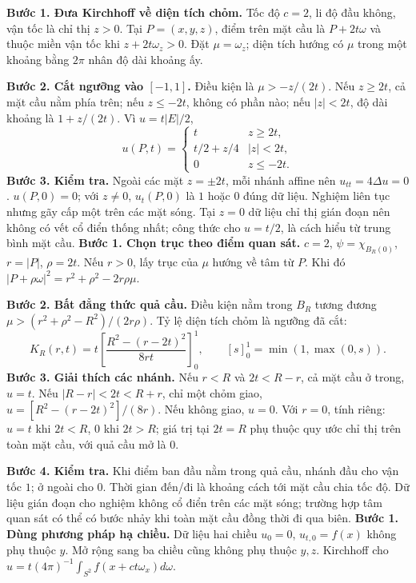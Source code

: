 \textbf{Bước 1. Đưa Kirchhoff về diện tích chỏm.} Tốc độ $c=2$, li độ đầu không, vận tốc là chỉ thị $z>0$. Tại $P=(x,y,z)$, điểm trên mặt cầu là $P+2t\omega$ và thuộc miền vận tốc khi $z+2t\omega_z>0$. Đặt $\mu=\omega_z$; diện tích hướng có $\mu$ trong một khoảng bằng $2\pi$ nhân độ dài khoảng ấy.

\textbf{Bước 2. Cắt ngưỡng vào $[-1,1]$.} Điều kiện là $\mu>-z/(2t)$. Nếu $z\ge2t$, cả mặt cầu nằm phía trên; nếu $z\le-2t$, không có phần nào; nếu $|z|<2t$, độ dài khoảng là $1+z/(2t)$. Vì $u=t|E|/2$,
\[u(P,t)=\begin{cases}t&z\ge2t,\\t/2+z/4&|z|<2t,\\0&z\le-2t.\end{cases}\]
\textbf{Bước 3. Kiểm tra.} Ngoài các mặt $z=\pm2t$, mỗi nhánh affine nên $u_{tt}=4\Delta u=0$. $u(P,0)=0$; với $z\ne0$, $u_t(P,0)$ là $1$ hoặc $0$ đúng dữ liệu. Nghiệm liên tục nhưng gãy cấp một trên các mặt sóng. Tại $z=0$ dữ liệu chỉ thị gián đoạn nên không có vết cổ điển thống nhất; công thức cho $u=t/2$, là cách hiểu từ trung bình mặt cầu.
\textbf{Bước 1. Chọn trục theo điểm quan sát.} $c=2$, $\psi=\chi_{B_R(0)}$, $r=|P|$, $\rho=2t$. Nếu $r>0$, lấy trục của $\mu$ hướng về tâm từ $P$. Khi đó $|P+\rho\omega|^2=r^2+\rho^2-2r\rho\mu$.

\textbf{Bước 2. Bất đẳng thức quả cầu.} Điều kiện nằm trong $B_R$ tương đương $\mu>(r^2+\rho^2-R^2)/(2r\rho)$. Tỷ lệ diện tích chỏm là ngưỡng đã cắt:
\[K_R(r,t)=t\left[\frac{R^2-(r-2t)^2}{8rt}\right]_0^1,\qquad [s]_0^1=\min(1,\max(0,s)).\]
\textbf{Bước 3. Giải thích các nhánh.} Nếu $r<R$ và $2t<R-r$, cả mặt cầu ở trong, $u=t$. Nếu $|R-r|<2t<R+r$, chỉ một chỏm giao, $u=[R^2-(r-2t)^2]/(8r)$. Nếu không giao, $u=0$. Với $r=0$, tính riêng: $u=t$ khi $2t<R$, $0$ khi $2t>R$; giá trị tại $2t=R$ phụ thuộc quy ước chỉ thị trên toàn mặt cầu, với quả cầu mở là $0$.

\textbf{Bước 4. Kiểm tra.} Khi điểm ban đầu nằm trong quả cầu, nhánh đầu cho vận tốc $1$; ở ngoài cho $0$. Thời gian đến/đi là khoảng cách tới mặt cầu chia tốc độ. Dữ liệu gián đoạn cho nghiệm không cổ điển trên các mặt sóng; trường hợp tâm quan sát có thể có bước nhảy khi toàn mặt cầu đồng thời đi qua biên.
\textbf{Bước 1. Dùng phương pháp hạ chiều.} Dữ liệu hai chiều $u_0=0$, $u_{t,0}=f(x)$ không phụ thuộc $y$. Mở rộng sang ba chiều cũng không phụ thuộc $y,z$. Kirchhoff cho $u=t(4\pi)^{-1}\int_{S^2}f(x+ct\omega_x)d\omega$.

